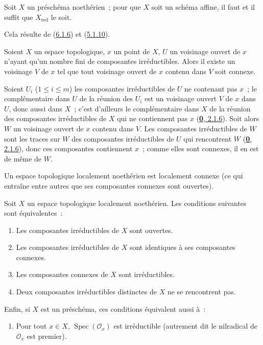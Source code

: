 \begin{corollary}[6.1.7]
\label{I.6.1.7-fr}
Soit $X$ un préschéma noethérien~; pour que $X$ soit un schéma affine, il faut
et il suffit que $X_{\mathrm{red}}$ le soit.
\end{corollary}

Cela résulte de (\hyperref[I.6.1.6-fr]{6.1.6}) et
(\hyperref[I.5.1.10-fr]{5.1.10}).

\begin{lemma}[6.1.8]
\label{I.6.1.8-fr}
Soient $X$ un espace topologique, $x$ un point de $X$, $U$ un voisinage ouvert
de $x$ n'ayant qu'un nombre fini de composantes irréductibles. Alors il existe
un voisinage $V$ de $x$ tel que tout voisinage ouvert de $x$ contenu dans $V$
soit connexe.
\end{lemma}

Soient $U_i$ ($1\leq i\leq m$) les composantes irréductibles de $U$ ne
contenant pas $x$~; le complémentaire dans $U$ de la réunion des $U_i$ est un
voisinage ouvert $V$ de $x$ dans $U$, donc aussi dans $X$~; c'est d'ailleurs
le complémentaire dans $X$ de la réunion des composantes irréductibles de $X$
qui ne contiennent pas $x$ (\hyperref[0.2.1.6-fr]{\textbf{0}, 2.1.6}). Soit alors $W$
un voisinage ouvert de $x$ contenu dans $V$. Les composantes irréductibles de
$W$ sont les traces sur $W$ des composantes irréductibles de $U$ qui
rencontrent $W$ (\hyperref[0.2.1.6-fr]{\textbf{0}, 2.1.6}), donc ces composantes
contiennent $x$~; comme elles sont connexes, il en est de même de $W$.

\begin{corollary}[6.1.9]
\label{I.6.1.9-fr}
Un espace topologique localement noethérien est localement connexe (ce qui
entraîne entre autres que ses composantes connexes sont ouvertes).
\end{corollary}

\begin{proposition}[6.1.10]
\label{I.6.1.10-fr}
Soit $X$ un espace topologique localement noethérien. Les conditions suivantes
sont équivalentes~:
\begin{enumerate}
  \item[\textup{a)}] Les composantes irréductibles de $X$ sont ouvertes.
  \item[\textup{b)}] Les composantes irréductibles de $X$ sont identiques à ses
    composantes connexes.
  \item[\textup{c)}] Les composantes connexes de $X$ sont irréductibles.
  \item[\textup{d)}] Deux composantes irréductibles distinctes de $X$ ne se rencontrent
    pas.
\end{enumerate}

Enfin, si $X$ est un préschéma, ces conditions équivalent aussi à~:
\begin{enumerate}
  \item[\textup{e)}] Pour tout $x\in X$, $\operatorname{Spec}(\mathscr{O}_x)$ est
    irréductible (autrement dit le nilradical de $\mathscr{O}_x$ est premier).
\end{enumerate}
\end{proposition}

